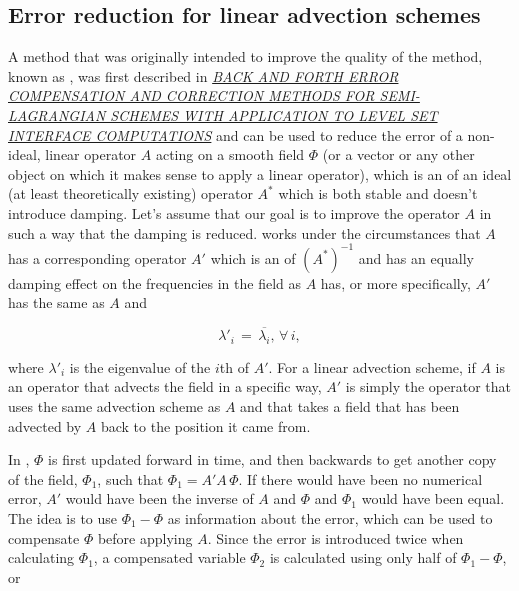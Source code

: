 \subsection{Error reduction for linear advection schemes}

A method that was originally intended to improve the quality of the \LS method, known as \BFECC, was first described in \textit{\href{http://www.google.se/url?sa=t&rct=j&q=&esrc=s&source=web&cd=1&cad=rja&ved=0CC0QFjAA&url=http\%3A\%2F\%2Fciteseerx.ist.psu.edu\%2Fviewdoc\%2Fdownload\%3Fdoi\%3D10.1.1.115.7663\%26rep\%3Drep1\%26type\%3Dpdf&ei=XHnwUOjlJoOK4ATAg4GgAg&usg=AFQjCNE4DIndzRfCNysW63F-FevKcuXxUA&bvm=bv.1357700187,d.bGE}{BACK AND FORTH ERROR COMPENSATION AND CORRECTION METHODS FOR SEMI-LAGRANGIAN SCHEMES WITH APPLICATION TO LEVEL SET INTERFACE COMPUTATIONS}} \citep{temp} and can be used to reduce the error of a non-ideal, linear operator $A$ acting on a smooth field $\Phi$ (or a vector or any other object on which it makes sense to apply a linear operator), which is an \approximation of an ideal (at least theoretically existing) operator $A^*$ which is both stable and doesn't introduce damping. Let's assume that our goal is to improve the operator $A$ in such a way that the damping is reduced. \BFECC works under the circumstances that $A$ has a corresponding operator $A'$ which is an \approximation of $(A^*)^{-1}$ and has an equally damping effect on the frequencies in the field as $A$ has, or more specifically, $A'$ has the same \eigenfunctions as $A$ and

\begin{equation}
\lambda'_i \,=\, \overline{\lambda_i}, \,\forall\,i,
\end{equation}

where $\lambda'_i$ is the eigenvalue of the $i$th \eigenfunction of $A'$. For a linear advection scheme, if $A$ is an operator that advects the field in a specific way, $A'$ is simply the operator that uses the same advection scheme as $A$ and that takes a field that has been advected by $A$ back to the position it came from.

In \BFECC, $\Phi$ is first updated forward in time, and then backwards to get another copy of the field, $\Phi_1$, such that $\Phi_1 = A'A\,\Phi$. If there would have been no numerical error, $A'$ would have been the inverse of $A$ and $\Phi$ and $\Phi_1$ would have been equal. The idea is to use $\Phi_1-\Phi$ as information about the error, which can be used to compensate $\Phi$ before applying $A$. Since the error is introduced twice when calculating $\Phi_1$, a compensated variable $\Phi_2$ is calculated using only half of $\Phi_1-\Phi$, or


